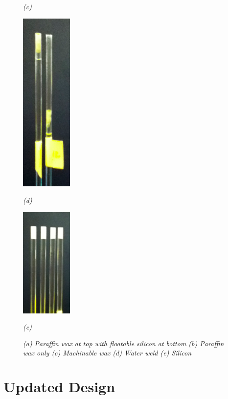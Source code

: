 \begin{figure}[htb]
\begin{minipage}[b]{1in}
    \centerline{\emph{(c)}}
  \end{minipage}
  \begin{minipage}[b]{1in}
    \centering
    \centerline{\mbox{\includegraphics[width=1in]{phantom/images/tube_sealings/water_weld.eps}}}
    \centerline{\emph{(d)}}
  \end{minipage}
  \begin{minipage}[b]{1in}
    \centering
    \centerline{\mbox{\includegraphics[width=1in]{phantom/images/tube_sealings/silicon.eps}}}
    \centerline{\emph{(e)}}
  \end{minipage}
  \caption{\emph{(a) Paraffin wax at top with floatable silicon at bottom (b) Paraffin wax only (c) Machinable wax (d) Water weld (e) Silicon}}
\end{figure}

\section{Updated Design}


